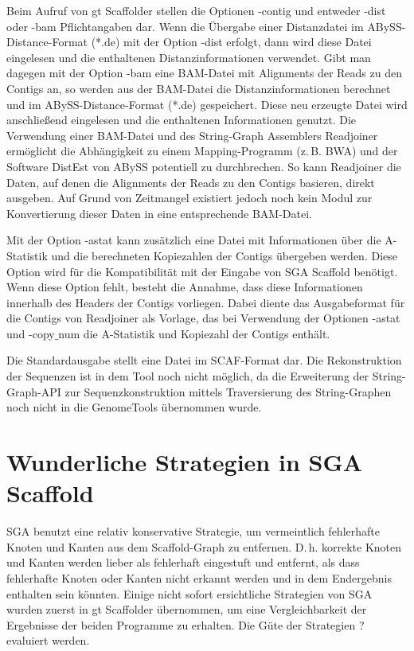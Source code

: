 \documentclass[a4paper,10pt,parskip]{scrartcl}
\begin{document}
Beim Aufruf von gt Scaffolder stellen die Optionen -contig und entweder
-dist oder -bam Pflichtangaben dar. Wenn die Übergabe einer Distanzdatei
im ABySS-Distance-Format (*.de) mit der Option -dist erfolgt, dann wird
diese Datei eingelesen und die enthaltenen Distanzinformationen verwendet.
Gibt man dagegen mit der Option -bam eine BAM-Datei mit Alignments der Reads
zu den Contigs an, so werden aus der BAM-Datei die Distanzinformationen
berechnet und im ABySS-Distance-Format (*.de) gespeichert. Diese neu erzeugte
Datei wird anschließend eingelesen und die enthaltenen Informationen genutzt. 
Die Verwendung einer BAM-Datei und des String-Graph Assemblers Readjoiner
ermöglicht die Abhängigkeit zu einem Mapping-Programm (z.\,B. BWA) und der
Software DistEst von ABySS potentiell zu durchbrechen. So kann Readjoiner die
Daten, auf denen die Alignments der Reads zu den Contigs basieren, direkt
ausgeben. Auf Grund von Zeitmangel existiert jedoch noch kein Modul zur
Konvertierung dieser Daten in eine entsprechende BAM-Datei.

Mit der Option -astat kann zusätzlich eine Datei mit Informationen
über die A-Statistik und die berechneten Kopiezahlen der Contigs
übergeben werden. Diese Option wird für die Kompatibilität mit der
Eingabe von SGA Scaffold benötigt. Wenn diese Option fehlt, besteht die
Annahme, dass diese Informationen innerhalb des Headers der
Contigs vorliegen. Dabei diente das Ausgabeformat für die Contigs von
Readjoiner als Vorlage, das bei Verwendung der Optionen -astat und
-copy$\_$num die A-Statistik und Kopiezahl der Contigs enthält.

Die Standardausgabe stellt eine Datei im SCAF-Format dar. Die
Rekonstruktion der Sequenzen ist in dem Tool noch nicht möglich, da
die Erweiterung der String-Graph-API zur Sequenzkonstruktion mittels
Traversierung des String-Graphen noch nicht in die GenomeTools
übernommen wurde.

\section{Wunderliche Strategien in SGA Scaffold}
\label{sec: wunderlich}
SGA benutzt eine relativ konservative Strategie, um vermeintlich
fehlerhafte Knoten und Kanten aus dem Scaffold-Graph zu
entfernen. D.\,h. korrekte Knoten und Kanten werden lieber als
fehlerhaft eingestuft und entfernt, als dass fehlerhafte Knoten oder
Kanten nicht erkannt werden und in dem Endergebnis enthalten sein
könnten. Einige nicht sofort ersichtliche Strategien von SGA wurden
zuerst in gt Scaffolder übernommen, um eine Vergleichbarkeit der
Ergebnisse der beiden Programme zu erhalten. Die Güte der Strategien
? evaluiert werden.
\end{document}
